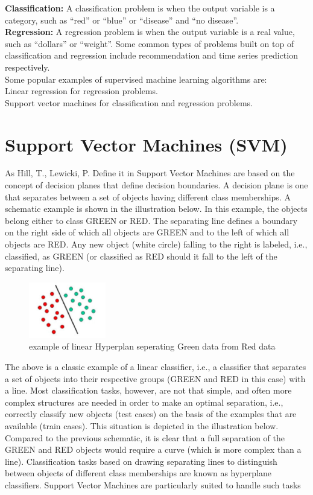 \textbf{Classification:} A classification problem is when the output variable is a category, such as “red” or “blue” or “disease” and “no disease”.\\ \textbf{Regression:}  A regression problem is when the output variable is a real value, such as “dollars” or “weight”.
Some common types of problems built on top of classification and regression include recommendation and time series prediction respectively.\\Some popular examples of supervised machine learning algorithms are:\\
Linear regression for regression problems.\\
Support vector machines for classification and regression problems.




\section{Support Vector Machines (SVM) }\label{sec:svm}
As Hill, T., Lewicki, P. Define it in \cite{svm} Support Vector Machines are based on the concept of decision planes that define decision boundaries. A decision plane is one that separates between a set of objects having different class memberships. A schematic example is shown in the illustration below. In this example, the objects belong either to class GREEN or RED. The separating line defines a boundary on the right side of which all objects are GREEN and to the left of which all objects are RED. Any new object (white circle) falling to the right is labeled, i.e., classified, as GREEN (or classified as RED should it fall to the left of the separating line).


\begin{figure}[H]
\centering
\includegraphics[width=0.3\textwidth]{img/svm1.png}
\caption{example of linear Hyperplan seperating Green data from Red data }
\label{122 }
\end{figure}


The above is a classic example of a linear classifier, i.e., a classifier that separates a set of objects into their respective groups (GREEN and RED in this case) with a line. Most classification tasks, however, are not that simple, and often more complex structures are needed in order to make an optimal separation, i.e., correctly classify new objects (test cases) on the basis of the examples that are available (train cases). This situation is depicted in the illustration below. Compared to the previous schematic, it is clear that a full separation of the GREEN and RED objects would require a curve (which is more complex than a line). Classification tasks based on drawing separating lines to distinguish between objects of different class memberships are known as hyperplane classifiers. Support Vector Machines are particularly suited to handle such tasks


